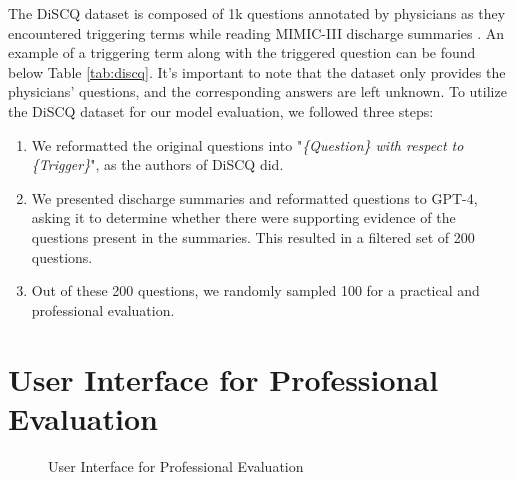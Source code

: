 \documentclass[11pt]{article}
\begin{document}
The DiSCQ \citep{lehman2022learning} dataset is composed of 1k questions annotated by physicians as they encountered triggering terms while reading MIMIC-III discharge summaries \citep{johnson2016mimic}.
An example of a triggering term along with the triggered question can be found below Table \ref{tab:discq}.
It's important to note that the dataset only provides the physicians' questions, and the corresponding answers are left unknown.
To utilize the DiSCQ dataset for our model evaluation, we followed three steps:

\begin{enumerate}
    \item We reformatted the original questions into "\textit{\{Question\} with respect to \{Trigger\}}", as the authors of DiSCQ did.
    \item We presented discharge summaries and reformatted questions to GPT-4, asking it to determine whether there were supporting evidence of the questions present in the summaries. This resulted in a filtered set of 200 questions.
    \item Out of these 200 questions, we randomly sampled 100 for a practical and professional evaluation.
\end{enumerate}

\begin{table}[h]
    \centering
    \caption{DiSCQ Example}
    \label{tab:discq}
\end{table}

\vfill\eject

\onecolumn



\onecolumn
\section{User Interface for Professional Evaluation}\label{ui}
\begin{figure}[!htbp]
    \centering
    \caption{User Interface for Professional Evaluation}
    \label{fig:ui}
\end{figure}
\end{document}
